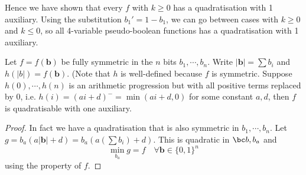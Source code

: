 \documentclass[11pt]{scrartcl}
\newcommand{\vc}[1]{\boldsymbol{#1}}
\begin{document}
Hence we have shown that every $f$ with $k\ge 0$ has a quadratisation with 1 auxiliary. Using the substitution $b_1'=1-b_1$,
we can go between cases with $k \ge 0$ and $k \le 0$, so all 4-variable pseudo-boolean functions has a quadratisation with 1 auxiliary.

\begin{theorem}
Let $f = f(\vc b)$ be fully symmetric in the $n$ bits $b_1, \cdots, b_n$. Write $|\vc b|=\sum b_i$ and $h(|b|) = f(\vc b)$. (Note that $h$ 
is well-defined because $f$ is symmetric. Suppose $h(0), \cdots, h(n)$ is an arithmetic progression but with all positive terms replaced by 0, 
i.e. $h(i) = (ai+d)^- = \min(ai+d, 0)$ for some constant $a, d$, then $f$ is quadratisable with one auxiliary.  
\end{theorem}

\begin{proof}
	In fact we have a quadratisation that is also symmetric in $b_1, \cdots, b_n$.
	Let $g = b_a(a|\vc b| + d) = b_a (a(\sum b_i) + d)$. This is quadratic in $\bc b, b_a$ and 
	\[\min_{b_a} g = f \quad \forall \vc b \in \{0, 1\}^n\]
	using the property of $f$.
\end{proof}
\end{document}
